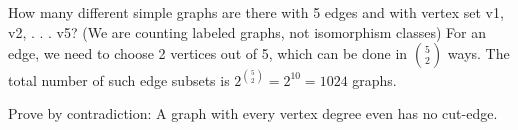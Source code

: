 \documentclass[12pt]{article}
\newenvironment{question}[2][Question]{\begin{trivlist}
\item[\hskip \labelsep {\bfseries #1}\hskip \labelsep {\bfseries #2.}]}{\end{trivlist}}
\begin{document}
\begin{question}{7}
 How many different simple graphs are there with 5 edges and with vertex set {v1, v2, . . . v5}?
(We are counting labeled graphs, not isomorphism classes)
For an edge, we need to choose 2 vertices out of 5, which can be done in ${5 \choose 2}$ ways. The total number of such edge subsets is $2^{5 \choose 2} = 2^{10} = 1024$ graphs.
\end{question}

\begin{question}{8}
Prove by contradiction: A graph with every vertex degree even has no cut-edge.
\end{question}




\end{document}
